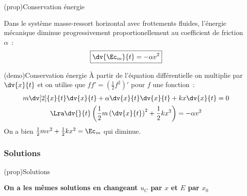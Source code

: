 \documentclass[../../main/main.tex]{subfiles}
\begin{document}
\begin{tcbraster}[raster columns=2, raster equal height=rows]
	\begin{tcb}[label=prop:emecacons](prop){Conservation énergie}

		Dans le système masse-ressort horizontal avec frottements fluides,
		l'énergie mécanique diminue progressivement proportionellement au
		coefficient de friction $\alpha$~:
		\begin{equation*}
			\boxed{\dv{\Ec_{m}}{t} = -\alpha v^2}
		\end{equation*}

	\end{tcb}
	\begin{tcb}[label=demo:emecacons](demo){Conservation énergie}
		À partir de l'équation différentielle on multiplie par $\dv{x}{t}$ et on
		utilise que $ff' = (\frac{1}{2}f^2)'$ pour $f$ une fonction~:
		\begin{gather*}
			m \dv[2]{x}{t} \dv{x}{t} + \alpha \dv{x}{t} \dv{x}{t} + kx \dv{x}{t} = 0\\
			\Lra \dv{}{t} \left( \frac{1}{2}m \left( \dv{x}{t} \right)^2 +
			\frac{1}{2}kx^2 \right) = - \alpha v^2
		\end{gather*}
		On a bien $ \frac{1}{2}mv^2 + \frac{1}{2}kx^2 = \Ec_m$ qui diminue.
	\end{tcb}
\end{tcbraster}

\subsubsection{Solutions}
\begin{center}
	\begin{tcb}[width=.8\linewidth, label=prop:ressortsolu](prop){Solutions}
		\begin{center}
			\textbf{On a les mêmes solutions en changeant $u_C$ par $x$ et $E$
				par $x_0$}
		\end{center}
	\end{tcb}
\end{center}
\end{document}
